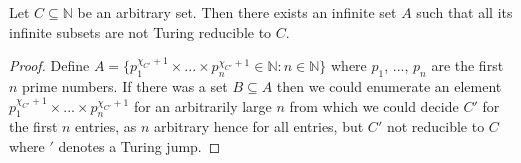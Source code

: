 \begin{lemma}
Let $C \subseteq \mathbb{N}$ be an arbitrary set. Then there exists an infinite set $A$ such that all its infinite subsets are not Turing reducible to $C$.
\end{lemma}
\begin{proof}
Define $A=\{p_1^{\chi_{C'}+1}\times...\times p_n^{\chi_{C'}+1} \in \mathbb{N} : n \in \mathbb{N}\}$ where $p_1$, ..., $p_n$ are the first $n$ prime numbers.
If there was a set $B \subseteq A$ then we could enumerate an element $p_1^{\chi_{C'}+1}\times...\times p_n^{\chi_{C'}+1}$ for an arbitrarily large $n$ from which we could decide $C'$ for the first $n$ entries, as $n$ arbitrary hence for all entries, but $C'$ not reducible to $C$ where $'$ denotes a Turing jump.
\end{proof}
